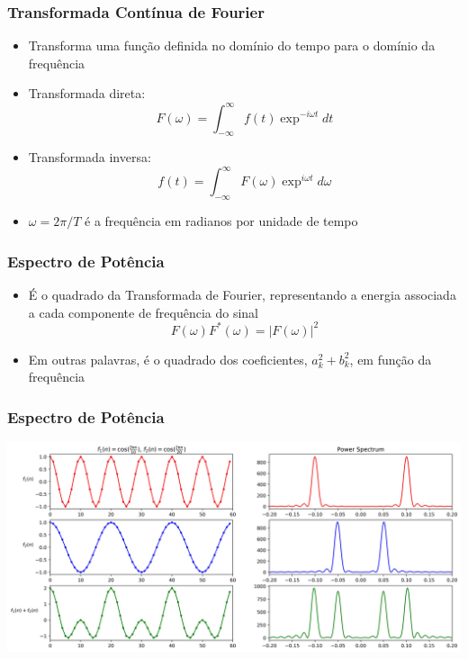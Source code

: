 \documentclass{beamer}
\begin{document}
\begin{frame}
\frametitle{Transformada Contínua de Fourier}
\begin{itemize}
\item Transforma uma função definida no domínio do tempo para o domínio da frequência
\item Transformada direta:
\begin{equation*}
F(\omega)=\int_{-\infty}^{\infty}f(t)\exp^{-i\omega t}dt
\end{equation*}
\item Transformada inversa:
\begin{equation*}
f(t)=\int_{-\infty}^{\infty}F(\omega)\exp^{i\omega t}d\omega
\end{equation*}
\item $\omega = 2\pi/T$ é a frequência em radianos por unidade de tempo
\end{itemize}
\end{frame}

\begin{frame}
\frametitle{Espectro de Potência}
\begin{itemize}
\item É o quadrado da Transformada de Fourier, representando a energia associada a cada componente de frequência do sinal
\begin{equation*}
F(\omega)F^{*}(\omega)=|F(\omega)|^{2} 
\end{equation*}
\item Em outras palavras, é o quadrado dos coeficientes, $a_{k}^{2} + b_{k}^{2}$, em função da frequência
\end{itemize}
\end{frame}
%
\begin{frame}
\frametitle{Espectro de Potência}
\begin{center}
\includegraphics[scale=0.37]{Figuras/ft_exemplo.jpg}
\end{center}
\end{frame}
\end{document}
